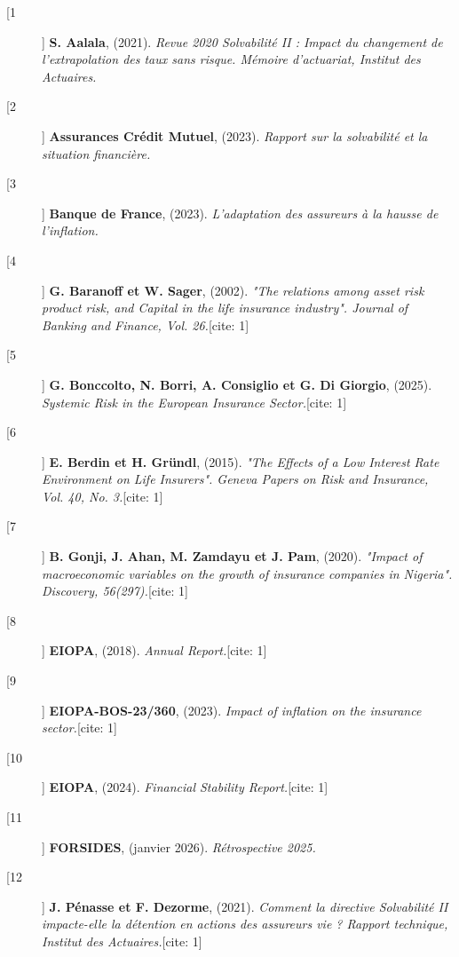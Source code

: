 \documentclass[
]{article}
\begin{document}
\begin{description}
    \item[[1]] \textbf{S. Aalala}, (2021). \textit{Revue 2020 Solvabilité II : Impact du changement de l'extrapolation des taux sans risque. Mémoire d'actuariat, Institut des Actuaires.}
    
    \item[[2]] \textbf{Assurances Crédit Mutuel}, (2023). \textit{Rapport sur la solvabilité et la situation financière.}
    
    \item[[3]] \textbf{Banque de France}, (2023). \textit{L'adaptation des assureurs à la hausse de l'inflation.}
    
    \item[[4]] \textbf{G. Baranoff et W. Sager}, (2002). \textit{"The relations among asset risk product risk, and Capital in the life insurance industry". Journal of Banking and Finance, Vol. 26.}[cite: 1]
    
    \item[[5]] \textbf{G. Bonccolto, N. Borri, A. Consiglio et G. Di Giorgio}, (2025). \textit{Systemic Risk in the European Insurance Sector.}[cite: 1]
    
    \item[[6]] \textbf{E. Berdin et H. Gründl}, (2015). \textit{"The Effects of a Low Interest Rate Environment on Life Insurers". Geneva Papers on Risk and Insurance, Vol. 40, No. 3.}[cite: 1]
    
    \item[[7]] \textbf{B. Gonji, J. Ahan, M. Zamdayu et J. Pam}, (2020). \textit{"Impact of macroeconomic variables on the growth of insurance companies in Nigeria". Discovery, 56(297).}[cite: 1]
    
    \item[[8]] \textbf{EIOPA}, (2018). \textit{Annual Report.}[cite: 1]
    
    \item[[9]] \textbf{EIOPA-BOS-23/360}, (2023). \textit{Impact of inflation on the insurance sector.}[cite: 1]
    
    \item[[10]] \textbf{EIOPA}, (2024). \textit{Financial Stability Report.}[cite: 1]
    
    \item[[11]] \textbf{FORSIDES}, (janvier 2026). \textit{Rétrospective 2025.}
    
    \item[[12]] \textbf{J. Pénasse et F. Dezorme}, (2021). \textit{Comment la directive Solvabilité II impacte-elle la détention en actions des assureurs vie ? Rapport technique, Institut des Actuaires.}[cite: 1]
    

\end{description}
\end{document}
